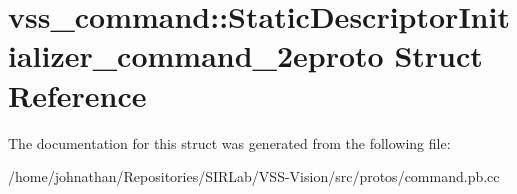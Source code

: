 \hypertarget{structvss__command_1_1StaticDescriptorInitializer__command__2eproto}{}\section{vss\+\_\+command\+:\+:Static\+Descriptor\+Initializer\+\_\+command\+\_\+2eproto Struct Reference}
\label{structvss__command_1_1StaticDescriptorInitializer__command__2eproto}


The documentation for this struct was generated from the following file\+:\begin{DoxyCompactItemize}
\item 
/home/johnathan/\+Repositories/\+S\+I\+R\+Lab/\+V\+S\+S-\/\+Vision/src/protos/command.\+pb.\+cc\end{DoxyCompactItemize}
